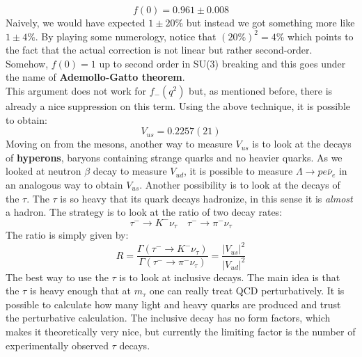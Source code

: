 \documentclass[../main.tex]{subfiles}
\begin{document}
\[
f(0)=0.961\pm0.008
\]
Naively, we would have expected $1\pm20\%$ but instead we got something more like $1\pm4\%$. By playing some numerology, notice that $(20\%)^2=4\%$ which points to the fact that the actual correction is not linear but rather second-order. Somehow, $f(0)=1$ up to second order in SU(3) breaking and this goes under the name of \textbf{Ademollo-Gatto theorem}.\\
This argument does not work for $f_-(q^2)$ but, as mentioned before, there is already a nice suppression on this term. Using the above technique, it is possible to obtain:
\[
V_{us}=0.2257(21)
\]
Moving on from the mesons, another way to measure $V_{us}$ is to look at the decays of \textbf{hyperons}, baryons containing strange quarks and no heavier quarks. As we looked at neutron $\beta$ decay to measure $V_{ud}$, it is possible to measure $\Lambda\to pe\overline{\nu}_e$ in an analogous way to obtain $V_{us}$. Another possibility is to look at the decays of the $\tau$. The $\tau$ is so heavy that its quark decays hadronize, in this sense it is \textit{almost} a hadron. The strategy is to look at the ratio of two decay rates:
\[
\tau^-\to K^-\nu_\tau \quad \tau^-\to\pi^-\nu_\tau
\]
The ratio is simply given by:
\[
R=\frac{\Gamma(\tau^-\to K^-\nu_\tau)}{\Gamma(\tau^-\to\pi^-\nu_\tau)}=\frac{|V_{us}|^2}{|V_{ud}|^2}
\]
The best way to use the $\tau$ is to look at inclusive decays. The main idea is that the $\tau$ is heavy
enough that at $m_\tau$ one can really treat QCD perturbatively. It is possible to calculate how
many light and heavy quarks are produced and trust the perturbative calculation. The inclusive
decay has no form factors, which makes it theoretically very nice, but currently the limiting factor
is the number of experimentally observed $\tau$ decays.
\end{document}
